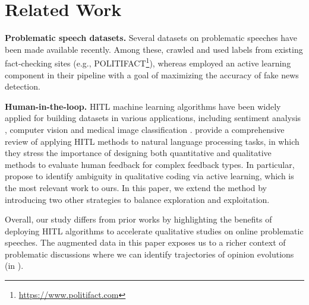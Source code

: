 

\section{Related Work}
\textbf{Problematic speech datasets.}
Several datasets \citep{wang2017liar,shu2018fakenewsnet,hasan2020truth} on problematic speeches have been made available recently. Among these, \citet{wang2017liar,shu2018fakenewsnet} crawled and used labels from existing fact-checking sites (e.g., POLITIFACT\footnote{\url{https://www.politifact.com}}), whereas \citet{hasan2020truth} employed an active learning component in their pipeline with a goal of maximizing the accuracy of fake news detection.

\textbf{Human-in-the-loop.}
HITL machine learning algorithms have been widely applied for building datasets in various applications, including sentiment analysis \citep{mozafari2014scaling}, computer vision \citep{vijayanarasimhan2011cost} and medical image classification \citep{hoi2006batch}. 
\citet{wang2021putting} provide a comprehensive review of applying HITL methods to natural language processing tasks, in which they stress the importance of designing both quantitative and qualitative methods to evaluate human feedback for complex feedback types. 
In particular, \citet{chen2018using} propose to identify ambiguity in qualitative coding via active learning, which is the most relevant work to ours. 
In this paper, we extend the method by introducing two other strategies to balance exploration and exploitation.

Overall, our study differs from prior works by highlighting the benefits of deploying HITL algorithms to accelerate qualitative studies on online problematic speeches. The augmented data in this paper exposes us to a richer context of problematic discussions where we can identify trajectories of opinion evolutions (in ).


